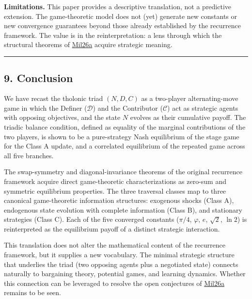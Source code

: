 \documentclass[
  11pt,
  letterpaper,
]{article}
\begin{document}
\textbf{Limitations.} This paper provides a descriptive translation, not
a predictive extension. The game-theoretic model does not (yet) generate
new constants or new convergence guarantees beyond those already
established by the recurrence framework. The value is in the
reinterpretation: a lens through which the structural theorems of
\href{https://github.com/baardev/truevalue/blob/main/docnav/Research/papers/1_recursive-tholonic-five-constants/1_recursive-tholonic-five-constants.pdf}{Mil26a}
acquire strategic meaning.

\begin{center}\rule{0.5\linewidth}{0.5pt}\end{center}

\subsection{9. Conclusion}\label{conclusion}

We have recast the tholonic triad \((N, D, C)\) as a two-player
alternating-move game in which the Definer (\(\mathcal{D}\)) and the
Contributor (\(\mathcal{C}\)) act as strategic agents with opposing
objectives, and the state \(N\) evolves as their cumulative payoff. The
triadic balance condition, defined as equality of the marginal
contributions of the two players, is shown to be a pure-strategy Nash
equilibrium of the stage game for the Class A update, and a correlated
equilibrium of the repeated game across all five branches.

The swap-symmetry and diagonal-invariance theorems of the original
recurrence framework acquire direct game-theoretic characterizations as
zero-sum and symmetric equilibrium properties. The three traversal
classes map to three canonical game-theoretic information structures:
exogenous shocks (Class A), endogenous state evolution with complete
information (Class B), and stationary strategies (Class C). Each of the
five converged constants (\(\pi/4\), \(\varphi\), \(e\), \(\sqrt{2}\),
\(\ln 2\)) is reinterpreted as the equilibrium payoff of a distinct
strategic interaction.

This translation does not alter the mathematical content of the
recurrence framework, but it supplies a new vocabulary. The minimal
strategic structure that underlies the triad (two opposing agents plus a
negotiated state) connects naturally to bargaining theory, potential
games, and learning dynamics. Whether this connection can be leveraged
to resolve the open conjectures of
\href{https://github.com/baardev/truevalue/blob/main/docnav/Research/papers/1_recursive-tholonic-five-constants/1_recursive-tholonic-five-constants.pdf}{Mil26a}
remains to be seen.
\end{document}
